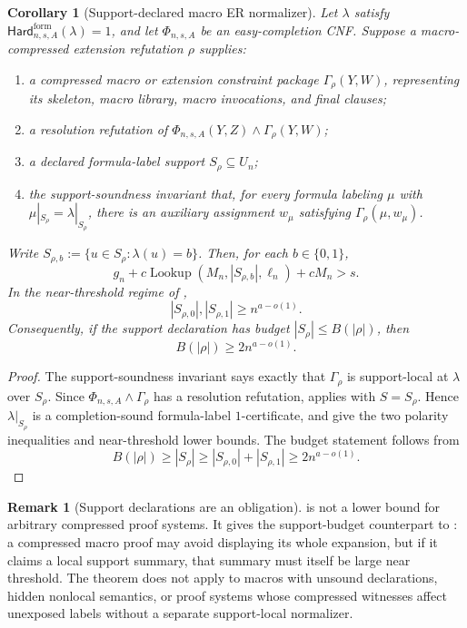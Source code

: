 \documentclass[11pt]{article}
\newtheorem{corollary}[theorem]{Corollary}
\theoremstyle{definition}
\newtheorem{remark}[theorem]{Remark}
\newcommand{\bits}{\{0,1\}}
\newcommand{\Lookup}{\operatorname{Lookup}}
\newcommand{\HardF}{\mathsf{Hard}^{\mathrm{form}}}
\begin{document}
\begin{corollary}[Support-declared macro ER normalizer]\label{cor:support-declared-macro-er}
Let \(\lambda\) satisfy \(\HardF_{n,s,A}(\lambda)=1\), and let \(\Phi_{n,s,A}\) be an easy-completion CNF.  Suppose a macro-compressed extension refutation \(\rho\) supplies:
\begin{enumerate}
  \item a compressed macro or extension constraint package \(\Gamma_\rho(Y,W)\), representing its skeleton, macro library, macro invocations, and final clauses;
  \item a resolution refutation of \(\Phi_{n,s,A}(Y,Z)\wedge\Gamma_\rho(Y,W)\);
  \item a declared formula-label support \(S_\rho\subseteq U_n\);
  \item the support-soundness invariant that, for every formula labeling \(\mu\) with \(\mu|_{S_\rho}=\lambda|_{S_\rho}\), there is an auxiliary assignment \(w_\mu\) satisfying \(\Gamma_\rho(\mu,w_\mu)\).
\end{enumerate}
Write \(S_{\rho,b}:=\{u\in S_\rho:\lambda(u)=b\}\).  Then, for each \(b\in\bits\),
\[
  g_n+c\Lookup(M_n,|S_{\rho,b}|,\ell_n)+cM_n>s.
\]
In the near-threshold regime of ,
\[
  |S_{\rho,0}|,|S_{\rho,1}|\ge n^{a-o(1)}.
\]
Consequently, if the support declaration has budget \(|S_\rho|\le B(|\rho|)\), then
\[
  B(|\rho|)\ge 2n^{a-o(1)}.
\]
\end{corollary}

\begin{proof}
The support-soundness invariant says exactly that \(\Gamma_\rho\) is support-local at \(\lambda\) over \(S_\rho\).  Since \(\Phi_{n,s,A}\wedge\Gamma_\rho\) has a resolution refutation,  applies with \(S=S_\rho\).  Hence \(\lambda|_{S_\rho}\) is a completion-sound formula-label \(1\)-certificate, and  give the two polarity inequalities and near-threshold lower bounds.  The budget statement follows from
\[
  B(|\rho|)\ge |S_\rho|\ge |S_{\rho,0}|+|S_{\rho,1}|\ge 2n^{a-o(1)}.
\]
\end{proof}

\begin{remark}[Support declarations are an obligation]\label{rem:support-declared-macro-er-scope}
 is not a lower bound for arbitrary compressed proof systems.  It gives the support-budget counterpart to : a compressed macro proof may avoid displaying its whole expansion, but if it claims a local support summary, that summary must itself be large near threshold.  The theorem does not apply to macros with unsound declarations, hidden nonlocal semantics, or proof systems whose compressed witnesses affect unexposed labels without a separate support-local normalizer.
\end{remark}
\end{document}
